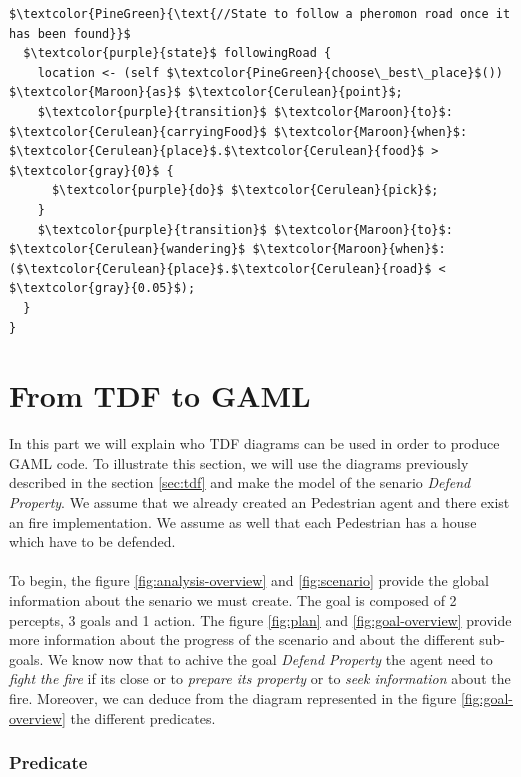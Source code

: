 \documentclass[12pt, a4paper]{memoir} %
\begin{document}
\begin{lstlisting}[mathescape,caption=Finite State Machine exemple.,label=code:fsm]
  $\textcolor{PineGreen}{\text{//State to follow a pheromon road once it has been found}}$
  $\textcolor{purple}{state}$ followingRoad {
    location <- (self $\textcolor{PineGreen}{choose\_best\_place}$()) $\textcolor{Maroon}{as}$ $\textcolor{Cerulean}{point}$;
    $\textcolor{purple}{transition}$ $\textcolor{Maroon}{to}$: $\textcolor{Cerulean}{carryingFood}$ $\textcolor{Maroon}{when}$: $\textcolor{Cerulean}{place}$.$\textcolor{Cerulean}{food}$ > $\textcolor{gray}{0}$ {
      $\textcolor{purple}{do}$ $\textcolor{Cerulean}{pick}$;
    }
    $\textcolor{purple}{transition}$ $\textcolor{Maroon}{to}$: $\textcolor{Cerulean}{wandering}$ $\textcolor{Maroon}{when}$: ($\textcolor{Cerulean}{place}$.$\textcolor{Cerulean}{road}$ < $\textcolor{gray}{0.05}$);
  }
}
			\end{lstlisting}


			\section{From TDF to GAML}

				In this part we will explain who TDF diagrams can be used in order to produce GAML code. To illustrate this section,
				we will use the diagrams previously described in the section \ref{sec:tdf} and make the model of the senario \textit{Defend Property}.
				We assume that we already created an Pedestrian agent and there exist an fire implementation. We assume as well that each Pedestrian
				has a house which have to be defended.
				\paragraph{}
				To begin, the figure \ref{fig:analysis-overview} and \ref{fig:scenario} provide the global information about the senario we must
				create. The goal is composed of 2 percepts, 3 goals and 1 action.
				The figure \ref{fig:plan} and \ref{fig:goal-overview} provide more information about the progress of the scenario and about the different sub-goals.
				We know now that to achive the goal \textit{Defend Property} the agent need to \textit{fight the fire} if its close or to \textit{prepare its property}
				or to \textit{seek information} about the fire. Moreover, we can deduce from the diagram represented in the figure \ref{fig:goal-overview} the different predicates.

				\subsubsection{Predicate}
\end{document}
